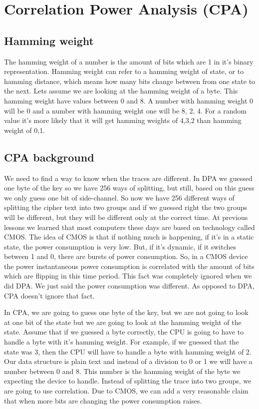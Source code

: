 \section{Correlation Power Analysis (CPA)}\label{c8_cpa:sec}

\subsection{Hamming weight}\label{c8_CPA_hamming_weight:subsec}

The hamming weight of a number is the amount of bits which are 1 in it's binary representation. 
Hamming weight can refer to a hamming weight of state, or to hamming distance, which means how many bits change between from one state to the next. Lets assume we are looking at the hamming weight of a byte. This hamming weight have values between 0 and 8. A number with hamming weight 0 will be 0 and a number with hamming weight one will be 8, 2, 4. For a random value it's more likely that it will get hamming weights of 4,3,2 than hamming weight of 0,1.

\subsection{CPA background}\label{c8_CPA_background:subsec}

We need to find a way to know when the traces are different. In DPA we guessed one byte of the key so we have 256 ways of splitting, but still, based on this guess we only guess one bit of side-channel. So now we have 256 different ways of splitting the cipher text into two groups and if we guessed right the two groups will be different, but they will be different only at the correct time. At previous lessons we learned that most computers these days are based on technology called CMOS. The idea of CMOS is that if nothing much is happening, if it's in a static state,  the power consumption is very low. But, if it's dynamic, if it switches between 1 and 0, there are bursts of power consumption. So, in a CMOS device the power instantaneous power consumption is correlated with the amount of bits which are flipping in this time period. This fact was completely ignored when we did DPA. We just said the power consumption was different. As opposed to DPA, CPA doesn't ignore that fact. 

In CPA, we are going to guess one byte of the key, but we are not going to look at one bit of the state but we are going to look at the hamming weight of the state. Assume that if we guessed a byte correctly, the CPU is going to have to handle a byte with it's hamming weight. For example, if we  guessed that the state was 3, then the CPU will have to handle a byte with hamming weight of 2. Our data structure is plain text and instead of a division to 0 or 1 we will have a number between 0 and 8. This number is the hamming weight of the byte we expecting the device to handle. Instead of splitting the trace into two groups, we are going to use correlation. Due to CMOS, we can add a very reasonable claim that when more bits are changing the power consumption raises.

